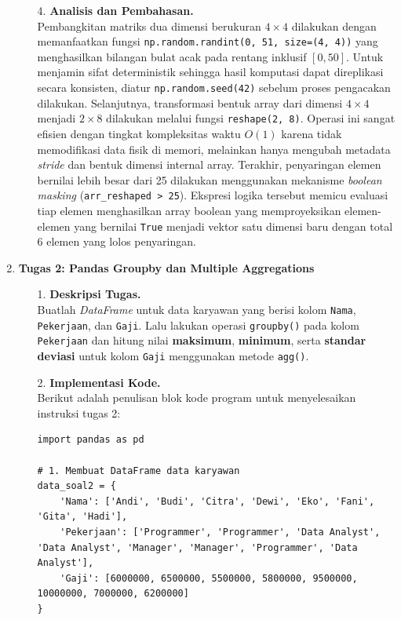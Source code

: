 \documentclass[a4paper,oneside,12pt]{report}
\begin{document}
\begin{enumerate}
\begin{enumerate}
        \item[4.] \textbf{Analisis dan Pembahasan.} \\
        Pembangkitan matriks dua dimensi berukuran $4 \times 4$ dilakukan dengan memanfaatkan fungsi \texttt{np.random.randint(0, 51, size=(4, 4))} yang menghasilkan bilangan bulat acak pada rentang inklusif $[0, 50]$. Untuk menjamin sifat deterministik sehingga hasil komputasi dapat direplikasi secara konsisten, diatur \texttt{np.random.seed(42)} sebelum proses pengacakan dilakukan. Selanjutnya, transformasi bentuk array dari dimensi $4 \times 4$ menjadi $2 \times 8$ dilakukan melalui fungsi \texttt{reshape(2, 8)}. Operasi ini sangat efisien dengan tingkat kompleksitas waktu $O(1)$ karena tidak memodifikasi data fisik di memori, melainkan hanya mengubah metadata \textit{stride} dan bentuk dimensi internal array. Terakhir, penyaringan elemen bernilai lebih besar dari 25 dilakukan menggunakan mekanisme \textit{boolean masking} (\texttt{arr\_reshaped > 25}). Ekspresi logika tersebut memicu evaluasi tiap elemen menghasilkan array boolean yang memproyeksikan elemen-elemen yang bernilai \texttt{True} menjadi vektor satu dimensi baru dengan total 6 elemen yang lolos penyaringan.
    \end{enumerate}

    \item \textbf{Tugas 2: Pandas Groupby dan Multiple Aggregations}
    \begin{enumerate}
        \item[1.] \textbf{Deskripsi Tugas.} \\
        Buatlah \textit{DataFrame} untuk data karyawan yang berisi kolom \texttt{Nama}, \texttt{Pekerjaan}, dan \texttt{Gaji}. Lalu lakukan operasi \texttt{groupby()} pada kolom \texttt{Pekerjaan} dan hitung nilai \textbf{maksimum}, \textbf{minimum}, serta \textbf{standar deviasi} untuk kolom \texttt{Gaji} menggunakan metode \texttt{agg()}.

        \item[2.] \textbf{Implementasi Kode.} \\
        Berikut adalah penulisan blok kode program untuk menyelesaikan instruksi tugas 2:
\begin{lstlisting}[style=pythonstyle, caption=Solusi Tugas 2 - Pandas Groupby dan Aggregation]
import pandas as pd

# 1. Membuat DataFrame data karyawan
data_soal2 = {
    'Nama': ['Andi', 'Budi', 'Citra', 'Dewi', 'Eko', 'Fani', 'Gita', 'Hadi'],
    'Pekerjaan': ['Programmer', 'Programmer', 'Data Analyst', 'Data Analyst', 'Manager', 'Manager', 'Programmer', 'Data Analyst'],
    'Gaji': [6000000, 6500000, 5500000, 5800000, 9500000, 10000000, 7000000, 6200000]
}


\end{lstlisting}
\end{enumerate}
\end{enumerate}
\end{document}
